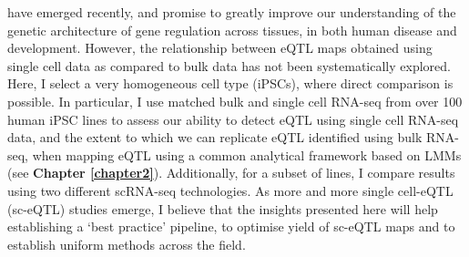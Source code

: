 have emerged recently, and promise
to greatly improve our understanding of the genetic architecture of 
gene regulation
across tissues, in both human disease and development.
However, the relationship between eQTL maps obtained using single cell data as compared to bulk data has not been systematically explored.
Here, I select a very homogeneous cell type (iPSCs), where direct comparison is possible.
In particular,
I use matched bulk and single cell RNA-seq from over 100 human 
iPSC lines 
to assess our ability to detect 
eQTL
using single cell RNA-seq data, and the extent to which we can replicate 
eQTL
identified using bulk RNA-seq, when mapping eQTL using a common analytical framework based on LMMs (see \textbf{Chapter 
\ref{chapter2}}).
Additionally, for a subset of lines, I compare results using two different scRNA-seq technologies.
As more and more single cell-eQTL
(sc-eQTL) studies emerge, I believe that
the insights presented here will help
establishing a `best practice' pipeline, to optimise yield of sc-eQTL
maps and to establish uniform methods across the field.

\newpage

